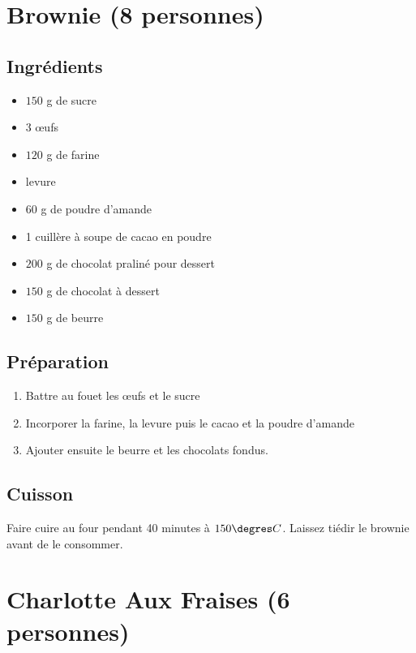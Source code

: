 \newpage
\section{Brownie (8 personnes)}
\subsection*{Ingrédients}
\begin{itemize}
\item $150$ g de sucre
\item 3 œufs
\item $120$ g de farine
\item levure
\item $60$ g de poudre d'amande
\item 1 cuillère à soupe de cacao en poudre
\item $200$ g de chocolat praliné pour dessert
\item $150$ g de chocolat à dessert
\item $150$ g de beurre
\end{itemize}

\subsection*{Préparation}
\begin{enumerate}
\item Battre au fouet les œufs et le sucre
\item Incorporer la farine, la levure puis le cacao et la poudre d'amande
\item Ajouter ensuite le beurre et les chocolats fondus.
\end{enumerate}

\subsection*{Cuisson}
Faire cuire au four pendant 40 minutes à $150\degres C$. Laissez tiédir le brownie avant de le consommer.


\newpage
\section{Charlotte Aux Fraises (6 personnes)}
